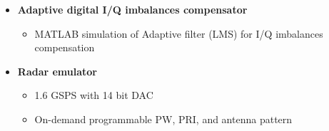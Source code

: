 \begin{itemize}
\begin{itemize}
	      \end{itemize}
	\item \textbf{Adaptive digital I/Q imbalances compensator}
	      \begin{itemize}
		      \item MATLAB simulation of Adaptive filter (LMS) for I/Q imbalances compensation
	      \end{itemize}
	\item \textbf{Radar emulator}
	      \begin{itemize}
		      \item 1.6 GSPS with 14 bit DAC
		      \item On-demand programmable PW, PRI, and antenna pattern
	      \end{itemize}
\end{itemize}